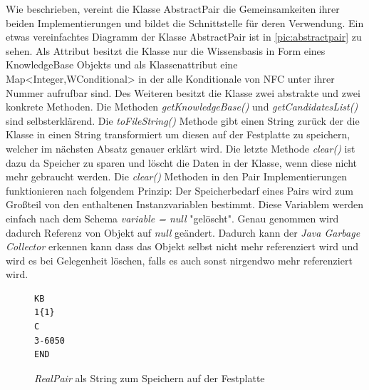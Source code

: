 \documentclass[12pt,a4paper]{article}
\begin{document}
Wie beschrieben, vereint die Klasse AbstractPair die Gemeinsamkeiten ihrer beiden Implementierungen und bildet die Schnittstelle für deren Verwendung. Ein etwas vereinfachtes Diagramm der Klasse AbstractPair ist in \autoref{pic:abstractpair} zu sehen. Als Attribut besitzt die Klasse nur die Wissensbasis in Form eines KnowledgeBase Objekts und als Klassenattribut eine Map<Integer,WConditional> in der alle Konditionale von NFC unter ihrer Nummer aufrufbar sind. Des Weiteren besitzt die Klasse zwei abstrakte und zwei konkrete Methoden. Die Methoden \textit{getKnowledgeBase()} und \textit{ getCandidatesList()} sind selbsterklärend. Die \textit{toFileString()} Methode gibt einen String zurück der die Klasse in einen String transformiert um diesen auf der Festplatte zu speichern, welcher im nächsten Absatz genauer erklärt wird. Die letzte Methode \textit{clear()} ist dazu da Speicher zu sparen und löscht die Daten in der Klasse, wenn diese nicht mehr gebraucht werden. Die \textit{clear()} Methoden in den Pair Implementierungen funktionieren nach folgendem Prinzip: Der Speicherbedarf eines Pairs wird zum Großteil von den enthaltenen Instanzvariablen bestimmt. Diese Variablem werden einfach nach dem Schema \textit{variable = null} "gelöscht". Genau genommen wird dadurch Referenz von Objekt auf \textit{null} geändert. Dadurch kann der \textit{Java Garbage Collector} erkennen kann dass das Objekt selbst nicht mehr referenziert wird und wird es bei Gelegenheit löschen, falls es auch sonst nirgendwo mehr referenziert wird.

\begin{figure}
\begin{lstlisting}
KB
1{1}
C
3-6050
END
\end{lstlisting}
\caption{\textit{RealPair} als String zum Speichern auf der Festplatte}
\label{code:pair-text}
\end{figure} 
\end{document}
